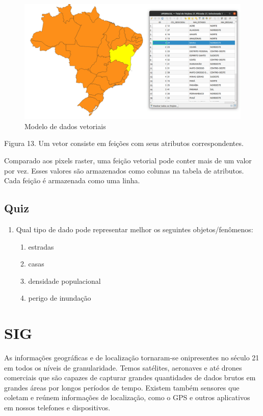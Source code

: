 \documentclass[
]{krantz}
\providecommand{\tightlist}{%
  \setlength{\itemsep}{0pt}\setlength{\parskip}{0pt}}
\begin{document}
\begin{figure}
\centering
\includegraphics{media/modulo0/vector.png}
\caption{Modelo de dados vetoriais}
\end{figure}

Figura 13. Um vetor consiste em feições com seus atributos correspondentes.

Comparado aos pixels raster, uma feição vetorial pode conter mais de um valor por vez. Esses valores são armazenados como colunas na tabela de atributos. Cada feição é armazenada como uma linha.

\hypertarget{quiz-1}{%
\subsection{Quiz}\label{quiz-1}}

\begin{enumerate}
\def\labelenumi{\arabic{enumi}.}
\tightlist
\item
  Qual tipo de dado pode representar melhor os seguintes objetos/fenômenos:

  \begin{enumerate}
  \def\labelenumii{\arabic{enumii}.}
  \tightlist
  \item
    estradas
  \item
    casas
  \item
    densidade populacional
  \item
    perigo de inundação
  \end{enumerate}
\end{enumerate}

\hypertarget{sig}{%
\section{SIG}\label{sig}}

As informações geográficas e de localização tornaram-se onipresentes no século 21 em todos os níveis de granularidade. Temos satélites, aeronaves e até drones comerciais que são capazes de capturar grandes quantidades de dados brutos em grandes áreas por longos períodos de tempo. Existem também sensores que coletam e reúnem informações de localização, como o GPS e outros aplicativos em nossos telefones e dispositivos.
\end{document}
